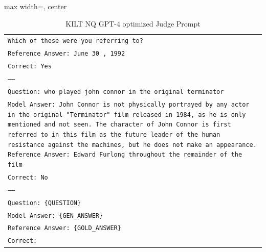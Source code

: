 \documentclass[11pt]{article}
\begin{document}
\begin{table}[ht]
\begin{adjustbox}{max width=\textwidth, center}
\begin{tabular}{>{\raggedright\arraybackslash\tt}p{}<{}}
\\
Which of these were you referring to?\\
Reference Answer: June 30 , 1992\\
Correct: Yes\\
-----\\
Question: who played john connor in the original terminator\\
Model Answer: John Connor is not physically portrayed by any actor in the original "Terminator" film released in 1984, as he is only mentioned and not seen. The character of John Connor is first referred to in this film as the future leader of the human resistance against the machines, but he does not make an appearance.
Reference Answer: Edward Furlong throughout the remainder of the film\\
Correct: No\\
-----\\
Question: \{QUESTION\}\\
Model Answer: \{GEN\_ANSWER\}\\
Reference Answer: \{GOLD\_ANSWER\}\\
Correct:\\
        \bottomrule
    \end{tabular}
    \end{adjustbox}

    \caption{
    KILT NQ  GPT-4 optimized Judge Prompt
    }
    \label{tab:nq_kilt_prompt_gpt4_opt}
\end{table}
\end{document}
